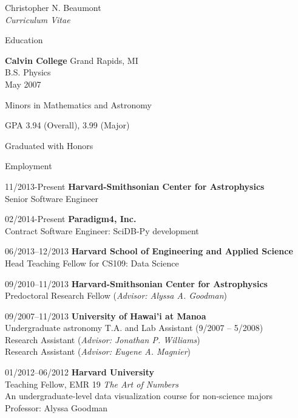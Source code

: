 \documentclass[10pt]{article}
\newenvironment{sublist}{%
	\begin{list}{}{%
		\setlength{\itemsep}{0em}\setlength{\parsep}{0em}%
		\setlength{\topsep}{0em}\setlength{\parskip}{0em}%
	}%
}%
{ \end{list} }
\begin{document}
\begin{cv}{Christopher N. Beaumont\\{\large \itshape Curriculum Vitae}}
\begin{cvlist}{Education}
	\item \textbf{Calvin College} Grand Rapids, MI\\
	B.S. Physics\\
	May 2007
	\begin{sublist}
		\item Minors in Mathematics and Astronomy
		\item GPA 3.94 (Overall), 3.99 (Major)
		\item Graduated with Honors
	\end{sublist}
\end{cvlist}

\begin{cvlist}{Employment}
	\item[11/2013-Present] \textbf{Harvard-Smithsonian Center for Astrophysics} \\
	Senior Software Engineer \\

	\item [02/2014-Present] \textbf{Paradigm4, Inc.} \\
	Contract Software Engineer: SciDB-Py development \\

	\item[06/2013--12/2013] \textbf{Harvard School of Engineering and Applied Science} \\
	Head Teaching Fellow for CS109: Data Science \\

	\item[09/2010--11/2013] \textbf{Harvard-Smithsonian Center for Astrophysics} \\
	Predoctoral Research Fellow (\emph{Advisor: Alyssa A. Goodman}) \\
	
	\item[09/2007--11/2013] \textbf{University of Hawai'i at Manoa} \\
	Undergraduate astronomy T.A. and Lab Assistant (9/2007 -- 5/2008) \\
	Research Assistant (\emph{Advisor: Jonathan P. Williams}) \\
	Research Assistant (\emph{Advisor: Eugene A. Magnier}) \\

	\item[01/2012--06/2012] \textbf{Harvard University} \\
	Teaching Fellow, EMR 19 \textit{The Art of Numbers}\\
	An undergraduate-level data visualization course for non-science majors \\
	Professor: Alyssa Goodman \\


\end{cvlist}
\end{cv}
\end{document}
